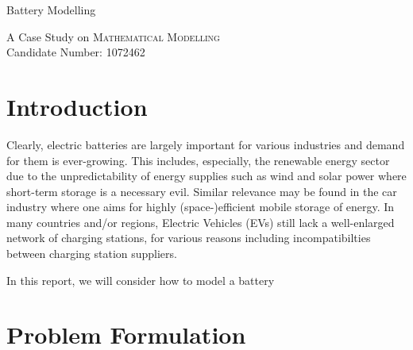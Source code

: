 \documentclass[12pt, a4paper]{article}
\title{\topictitle}
\author{Candidate \candidatenumber}
\date{\today}
\newcommand{\topictitle}{Battery Modelling}
\newcommand{\candidatenumber}{1072462}
\newcommand{\course}{Mathematical Modelling}
\begin{document}
  \pagestyle{plain}
  \begin{center}
    \vspace*{-2.5cm}
    \Large \topictitle \\
    \vspace{.3cm}

    \normalsize A Case Study on \textcolor{themecolor3}{\textsc{\course}}\\
    \normalsize Candidate Number: \textcolor{themecolor3}{\candidatenumber}
    \vspace{.3cm}
  \end{center}

  \begin{abstract}
    \label{abstract}
    This work will attempt to

  \end{abstract}

  \tableofcontents

  \pagebreak
  \pagestyle{normal}

  \section{Introduction}
  Clearly, electric batteries are largely important for various industries and demand for them is ever-growing.
  This includes, especially, the renewable energy sector due to the unpredictability of energy supplies such as wind and solar power where short-term storage is a necessary evil.
  Similar relevance may be found in the car industry where one aims for highly (space-)efficient mobile storage of energy.
  In many countries and/or regions, Electric Vehicles (EVs) still lack a well-enlarged network of charging stations, for various reasons including incompatibilties between charging station suppliers.

  In this report, we will consider how to model a battery

  \section{Problem Formulation}
\end{document}
